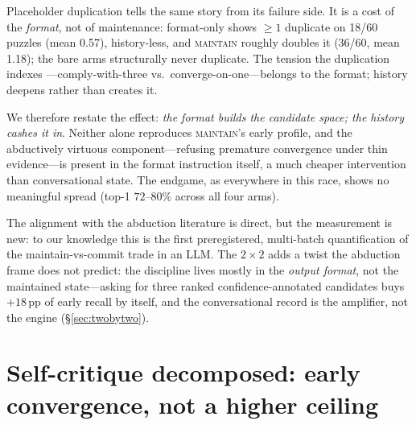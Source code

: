 \documentclass[10pt]{article}
\newcommand{\Mmaint}{\textsc{maintain}}
\begin{document}
Placeholder duplication tells the same story from its failure side. It
is a cost of the \emph{format}, not of maintenance: format-only shows
$\ge 1$ duplicate on 18/60 puzzles (mean 0.57), history-less, and
\Mmaint{} roughly doubles it (36/60, mean 1.18); the bare arms
structurally never duplicate. The tension the duplication indexes
---comply-with-three vs.\ converge-on-one---belongs to the format;
history deepens rather than creates it.

We therefore restate the effect: \emph{the format builds the candidate
space; the history cashes it in}. Neither alone reproduces \Mmaint{}'s
early profile, and the abductively virtuous component---refusing
premature convergence under thin evidence---is present in the format
instruction itself, a much cheaper intervention than conversational
state. The endgame, as everywhere in this race, shows no meaningful
spread (top-1 $72$--$80\%$ across all four arms).

The alignment with the abduction literature
\citep{peirce1878abduction,josephson1996abductive,tenenbaum2011grow} is
direct, but the measurement is new: to our knowledge this is the first
preregistered, multi-batch quantification of the maintain-vs-commit
trade in an LLM. The $2\times2$ adds a twist the abduction frame does
not predict: the discipline lives mostly in the \emph{output format},
not the maintained state---asking for three ranked confidence-annotated
candidates buys $+18$\,pp of early recall by itself, and the
conversational record is the amplifier, not the engine
(\S\ref{sec:twobytwo}).

\section{Self-critique decomposed: early convergence, not a higher ceiling}
\label{sec:early}
\end{document}
